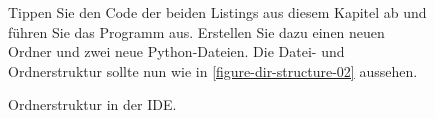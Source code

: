 \begin{figure}[htb]
\centering
\begin{minipage}{0.35\textwidth}
\centering
{}
\caption{Ordnerstruktur in der \ac{IDE}.}
\label{figure-dir-structure-02}
\end{minipage}
\hfill
\begin{minipage}{0.45\textwidth}
\centering
	\begin{important}
	Tippen Sie den Code der beiden Listings aus diesem Kapitel ab und führen Sie das Programm aus. Erstellen Sie dazu einen neuen Ordner und zwei neue Python-Dateien. Die Datei- und Ordnerstruktur sollte nun wie in \autoref{figure-dir-structure-02} aussehen.
	\end{important}
\end{minipage}
\end{figure}
